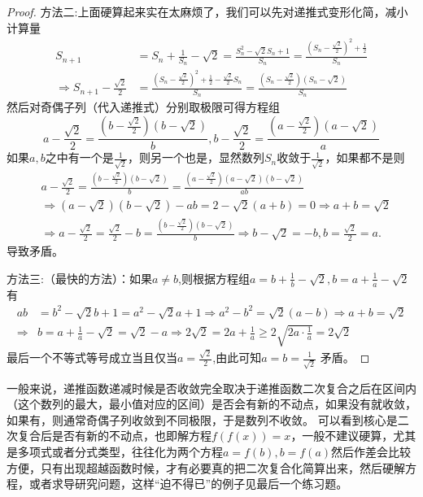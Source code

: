 \documentclass[../../main.tex]{subfiles}
\begin{document}
\begin{proof}
{\color{blue}方法二:}上面硬算起来实在太麻烦了，我们可以先对递推式变形化简，减小计算量
\begin{align*}
S_{n + 1}&=S_n+\frac{1}{S_n}-\sqrt{2}=\frac{S_n^2-\sqrt{2}S_n + 1}{S_n}=\frac{\left(S_n-\frac{\sqrt{2}}{2}\right)^2+\frac{1}{2}}{S_n}\\
\Rightarrow S_{n + 1}-\frac{\sqrt{2}}{2}&=\frac{\left(S_n-\frac{\sqrt{2}}{2}\right)^2+\frac{1}{2}-\frac{\sqrt{2}}{2}S_n}{S_n}=\frac{\left(S_n-\frac{\sqrt{2}}{2}\right)(S_n-\sqrt{2})}{S_n}
\end{align*}
然后对奇偶子列（代入递推式）分别取极限可得方程组
\[a-\frac{\sqrt{2}}{2}=\frac{\left(b-\frac{\sqrt{2}}{2}\right)(b - \sqrt{2})}{b},b-\frac{\sqrt{2}}{2}=\frac{\left(a-\frac{\sqrt{2}}{2}\right)(a - \sqrt{2})}{a}\]
如果\(a,b\)之中有一个是\(\frac{1}{\sqrt{2}}\)，则另一个也是，显然数列\(S_n\)收敛于\(\frac{1}{\sqrt{2}}\)，如果都不是则
\begin{align*}
&a-\frac{\sqrt{2}}{2}=\frac{\left( b-\frac{\sqrt{2}}{2} \right) (b-\sqrt{2})}{b}=\frac{\left( a-\frac{\sqrt{2}}{2} \right) (a-\sqrt{2})(b-\sqrt{2})}{ab}
\\
&\Rightarrow \left( a-\sqrt{2} \right) \left( b-\sqrt{2} \right) -ab=2-\sqrt{2}(a+b)=0\Rightarrow a+b=\sqrt{2}
\\
&\Rightarrow a-\frac{\sqrt{2}}{2}=\frac{\sqrt{2}}{2}-b=\frac{\left( b-\frac{\sqrt{2}}{2} \right) (b-\sqrt{2})}{b}\Rightarrow b-\sqrt{2}=-b,b=\frac{\sqrt{2}}{2}=a.
\end{align*}
导致矛盾。

{\color{blue}方法三:}（最快的方法）：如果\(a\neq b\),则根据方程组\(a = b+\frac{1}{b}-\sqrt{2},b = a+\frac{1}{a}-\sqrt{2}\)有
\begin{align*}
ab&=b^2-\sqrt{2}b+1=a^2-\sqrt{2}a+1\Rightarrow a^2-b^2=\sqrt{2}\left( a-b \right) \Rightarrow a+b=\sqrt{2}\\
\Rightarrow &b=a+\frac{1}{a}-\sqrt{2}=\sqrt{2}-a\Rightarrow 2\sqrt{2}=2a+\frac{1}{a}\geqslant 2\sqrt{2a\cdot\frac{1}{a}}=2\sqrt{2}
\end{align*}
最后一个不等式等号成立当且仅当$a=\frac{\sqrt{2}}{2}$,由此可知\(a = b=\frac{1}{\sqrt{2}}\) 矛盾。
\end{proof}
\begin{remark}
一般来说，递推函数递减时候是否收敛完全取决于递推函数二次复合之后在区间内（这个数列的最大，最小值对应的区间）是否会有新的不动点，如果没有就收敛，如果有，则通常奇偶子列收敛到不同极限，于是数列不收敛。
可以看到核心是二次复合后是否有新的不动点，也即解方程\(f(f(x)) = x\)，一般不建议硬算，尤其是多项式或者分式类型，往往化为两个方程\(a = f(b),b = f(a)\)然后作差会比较方便，只有出现超越函数时候，才有必要真的把二次复合化简算出来，然后硬解方程，或者求导研究问题，这样“迫不得已”的例子见最后一个练习题。
\end{remark}
\end{document}
